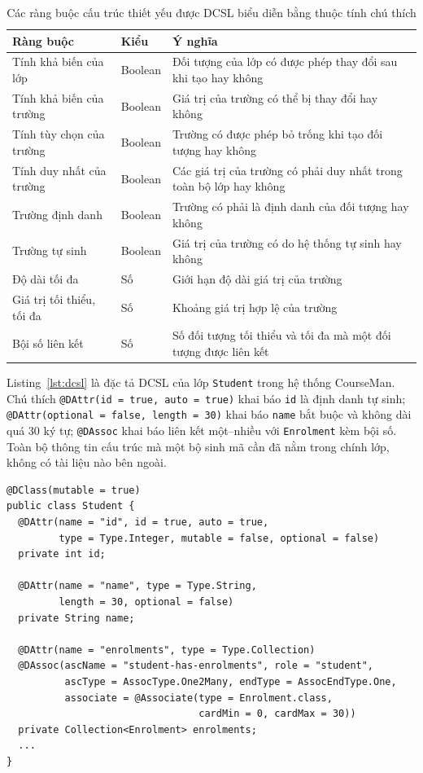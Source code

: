 \begin{table}[htbp]
\centering
\caption{Các ràng buộc cấu trúc thiết yếu được DCSL biểu diễn bằng thuộc tính chú thích \cite{le2018dcsl}}
\label{tab:rang-buoc-dcsl}
\small
\begin{tabularx}{\textwidth}{@{}llX@{}}
\toprule
\textbf{Ràng buộc} & \textbf{Kiểu} & \textbf{Ý nghĩa} \\
\midrule
Tính khả biến của lớp & Boolean & Đối tượng của lớp có được phép thay đổi sau khi tạo hay không \\
Tính khả biến của trường & Boolean & Giá trị của trường có thể bị thay đổi hay không \\
Tính tùy chọn của trường & Boolean & Trường có được phép bỏ trống khi tạo đối tượng hay không \\
Tính duy nhất của trường & Boolean & Các giá trị của trường có phải duy nhất trong toàn bộ lớp hay không \\
Trường định danh & Boolean & Trường có phải là định danh của đối tượng hay không \\
Trường tự sinh & Boolean & Giá trị của trường có do hệ thống tự sinh hay không \\
Độ dài tối đa & Số & Giới hạn độ dài giá trị của trường \\
Giá trị tối thiểu, tối đa & Số & Khoảng giá trị hợp lệ của trường \\
Bội số liên kết & Số & Số đối tượng tối thiểu và tối đa mà một đối tượng được liên kết \\
\bottomrule
\end{tabularx}
\end{table}

\begin{vidu}
\label{vd:dcsl}
Listing~\ref{lst:dcsl} là đặc tả DCSL của lớp \texttt{Student} trong hệ thống CourseMan. Chú thích \texttt{@DAttr(id = true, auto = true)} khai báo \texttt{id} là định danh tự sinh; \texttt{@DAttr(optional = false, length = 30)} khai báo \texttt{name} bắt buộc và không dài quá 30 ký tự; \texttt{@DAssoc} khai báo liên kết một--nhiều với \texttt{Enrolment} kèm bội số. Toàn bộ thông tin cấu trúc mà một bộ sinh mã cần đã nằm trong chính lớp, không có tài liệu nào bên ngoài.
\end{vidu}

\begin{lstlisting}[caption={Đặc tả DCSL của lớp Student (rút gọn)},label={lst:dcsl}]
@DClass(mutable = true)
public class Student {
  @DAttr(name = "id", id = true, auto = true,
         type = Type.Integer, mutable = false, optional = false)
  private int id;

  @DAttr(name = "name", type = Type.String,
         length = 30, optional = false)
  private String name;

  @DAttr(name = "enrolments", type = Type.Collection)
  @DAssoc(ascName = "student-has-enrolments", role = "student",
          ascType = AssocType.One2Many, endType = AssocEndType.One,
          associate = @Associate(type = Enrolment.class,
                                 cardMin = 0, cardMax = 30))
  private Collection<Enrolment> enrolments;
  ...
}
\end{lstlisting}

